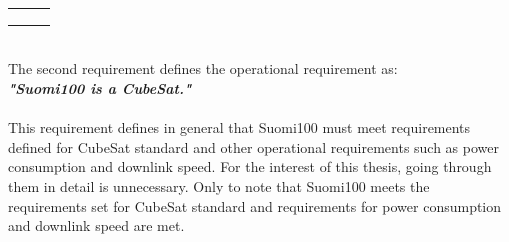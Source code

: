 \documentclass[english,12pt,a4paper,pdftex,elec,utf8]{aaltothesis}
\begin{document}
\begin{table}[!h]
\begin{tabular}{|l|l|l|}
                                                                                                                                                  \\ 
                                                                                                                                                 &
                                                                                                                                                 &
                                                                                                                                                  \\
                                                                                                                                                  &
                                                                                                                                                  &
                                                                                                                                                  \\ 
                                                                                                                                                  &
                                                                                                                                                  &
                                                                                                                                                   \\
                                                                                                                                                  
                                                                                                                                                   
                                                                                                                                                    \hline
\end{tabular}
\end{table}
\\
The second requirement defines the operational requirement as:\\
\textbf{\textit{"Suomi100 is a CubeSat."}}
\\
\\
This requirement defines in general that Suomi100 must meet requirements defined for CubeSat standard and other operational requirements such as power consumption and downlink speed. For the interest of this thesis, going through them in detail is unnecessary. Only to note that Suomi100 meets the requirements set for CubeSat standard and requirements for power consumption and downlink speed are met. \par
\end{document}
